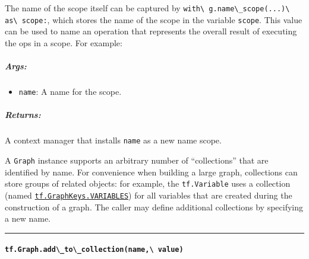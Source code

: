 The name of the scope itself can be captured by
\lstinline{with\ g.name\_scope(...)\ as\ scope:}, which stores the name of
the scope in the variable \lstinline{scope}. This value can be used to name
an operation that represents the overall result of executing the ops in
a scope. For example:

\begin{Shaded}
\begin{Highlighting}[]
\OperatorTok{=} 
 \NormalTok{) } 
  \OperatorTok{=} \OperatorTok{=}\NormalTok{)}
  \OperatorTok{=} \OperatorTok{=}\NormalTok{)}
  \OperatorTok{=} \OperatorTok{+} 
  \OperatorTok{=} \OperatorTok{=}
\end{Highlighting}
\end{Shaded}

\subparagraph{Args: }\label{args-3}

\begin{itemize}
\tightlist
\item
  \lstinline{name}: A name for the scope.
\end{itemize}

\subparagraph{Returns: }\label{returns-4}

A context manager that installs \lstinline{name} as a new name scope.

A \lstinline{Graph} instance supports an arbitrary number of
``collections'' that are identified by name. For convenience when
building a large graph, collections can store groups of related objects:
for example, the \lstinline{tf.Variable} uses a collection (named
\href{../../api_docs/python/framework.md\#GraphKeys}{\lstinline{tf.GraphKeys.VARIABLES}})
for all variables that are created during the construction of a graph.
The caller may define additional collections by specifying a new name.

\begin{center}\rule{0.5\linewidth}{\linethickness}\end{center}

\paragraph{\texorpdfstring{\lstinline{tf.Graph.add\_to\_collection(name,\ value)}
}{tf.Graph.add\_to\_collection(name, value) }}\label{tf.graph.addux5ftoux5fcollectionname-value}

